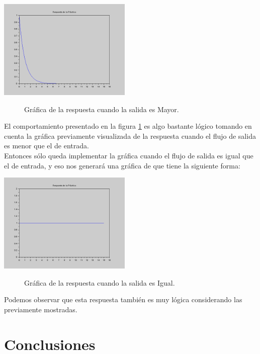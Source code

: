 \documentclass[12pt]{article}
\begin{document}
\begin{center}
    \includegraphics[width=2.5in]{SalidaMayor.png}
    \begin{figure}[!h]
	\caption{Gráfica de la respuesta cuando la salida es Mayor.}\label{ref:Figura2}
	\end{figure}
\end{center}

El comportamiento presentado en la figura \ref{ref:Figura2} es algo bastante lógico tomando en cuenta la gráfica previamente visualizada de la respuesta cuando el flujo de salida es menor que el de entrada.\\

Entonces sólo queda implementar la gráfica cuando el flujo de salida es igual que el de entrada, y eso nos generará una gráfica de que tiene la siguiente forma:

\begin{center}
    \includegraphics[width=2.5in]{SalidaIgual.png}
    \begin{figure}[!h]
	\caption{Gráfica de la respuesta cuando la salida es Igual.}\label{ref:Figura3}
	\end{figure}
\end{center}

Podemos observar que esta respuesta también es muy lógica considerando las previamente mostradas.

\section{Conclusiones}
\end{document}
